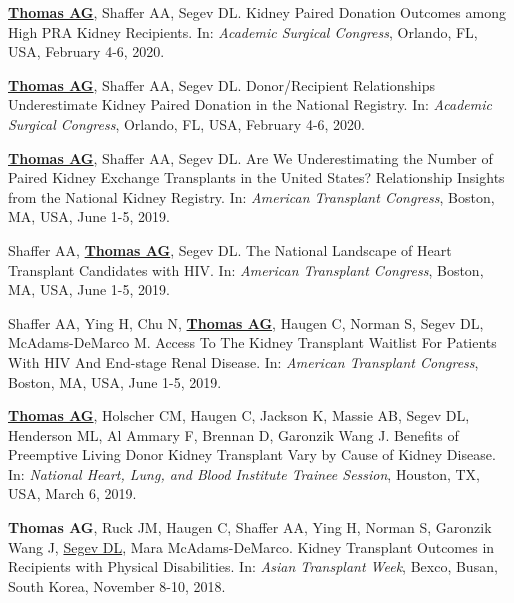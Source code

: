 \documentclass[10pt]{article}
\makeatletter
\newlength{\bibhang}
\newlength{\bibsep}
 {\@listi \global\bibsep\itemsep \global\advance\bibsep by\parsep}
\newenvironment{bibenum*}
  {\renewcommand\labelenumi{[\theenumi]}%
   \etaremune[
     topsep=0pt,
     itemsep=\bibsep,
     parsep=0pt,partopsep=0pt,
     itemindent=-\bibhang,
     leftmargin={\bibhang+\widthof{[999]}}]}
  {\endetaremune}
\makeatother
\begin{document}
\begin{bibenum*}

\item \underline{\textbf{Thomas AG}}, Shaffer AA, Segev DL.
  Kidney Paired Donation Outcomes among High PRA Kidney Recipients.
  In: \emph{Academic Surgical Congress},
  Orlando, FL, USA, February 4-6, 2020.

\item \underline{\textbf{Thomas AG}}, Shaffer AA, Segev DL.
  Donor/Recipient Relationships Underestimate Kidney Paired
  Donation in the National Registry.
  In: \emph{Academic Surgical Congress},
  Orlando, FL, USA, February 4-6, 2020.


\item \underline{\textbf{Thomas AG}}, Shaffer AA, Segev DL.
  Are We Underestimating the Number of Paired Kidney Exchange
  Transplants in the United States? Relationship Insights
  from the National Kidney Registry.
  In: \emph{American Transplant Congress},
  Boston, MA, USA, June 1-5, 2019.

\item Shaffer AA, \underline{\textbf{Thomas AG}}, Segev DL.
  The National Landscape of Heart Transplant Candidates with HIV.
  In: \emph{American Transplant Congress},
  Boston, MA, USA, June 1-5, 2019.

\item Shaffer AA, Ying H, Chu N, \underline{\textbf{Thomas AG}},
  Haugen C, Norman S, Segev DL, McAdams-DeMarco M.
  Access To The Kidney Transplant Waitlist For Patients With HIV
  And End-stage Renal Disease.
  In: \emph{American Transplant Congress},
  Boston, MA, USA, June 1-5, 2019.

\item \underline{\textbf{Thomas AG}}, Holscher CM, Haugen C,
  Jackson K, Massie AB,
  Segev DL, Henderson ML, Al Ammary F, Brennan D, Garonzik Wang J.
  Benefits of Preemptive Living Donor Kidney Transplant Vary by
  Cause of Kidney Disease.
  In: \emph{National Heart, Lung, and Blood Institute Trainee Session},
  Houston, TX, USA, March 6, 2019.

\item \textbf{Thomas AG}, Ruck JM, Haugen C, Shaffer AA, Ying H,
  Norman S, Garonzik Wang J, \underline{Segev DL}, Mara McAdams-DeMarco.
  Kidney Transplant Outcomes in Recipients with Physical Disabilities.
  In: \emph{Asian Transplant Week},
  Bexco, Busan, South Korea, November 8-10, 2018.


\end{bibenum*}
\end{document}
